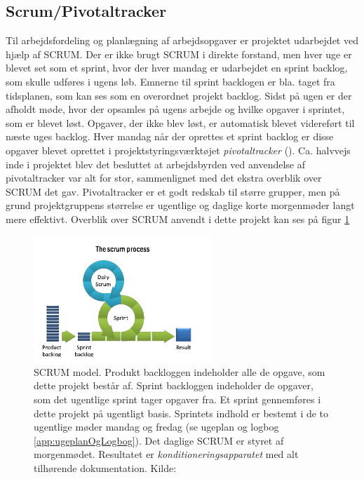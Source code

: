 \subsection{Scrum/Pivotaltracker} \label{title:scrum}
Til arbejdsfordeling og planlægning af arbejdsopgaver er projektet udarbejdet ved hjælp af SCRUM. Der er ikke brugt SCRUM i direkte forstand, men hver uge er blevet set som et sprint, hvor der hver mandag er udarbejdet en sprint backlog, som skulle udføres i ugens løb. Emnerne til sprint backlogen er bla. taget fra tidsplanen, som kan ses som en overordnet projekt backlog. Sidst på ugen er der afholdt møde, hvor der opsamles på ugens arbejde og hvilke opgaver i sprintet, som er blevet løst. Opgaver, der ikke blev løst, er automatisk blevet videreført til næste uges backlog. Hver mandag når der oprettes et sprint backlog er disse opgaver blevet oprettet i projektstyringsværktøjet \textit{pivotaltracker} (\cite{RefWorks:36}). Ca. halvvejs inde i projektet blev det besluttet at arbejdsbyrden ved anvendelse af pivotaltracker var alt for stor, sammenlignet med det ekstra overblik over SCRUM det gav. Pivotaltracker er et godt redskab til større grupper, men på grund projektgruppens størrelse er ugentlige og daglige korte morgenmøder langt mere effektivt. Overblik over SCRUM anvendt i dette projekt kan ses på figur \ref{fig:scrumProcess}

	\begin{figure}[H]
		\centering
		\includegraphics[width = 0.6\textwidth]{billeder/scrumProcess.png}
		\caption{SCRUM model. Produkt backloggen indeholder alle de opgave, som dette projekt består af. Sprint backloggen indeholder de opgaver, som det ugentlige sprint tager opgaver fra. Et sprint gennemføres i dette projekt på ugentligt basis. Sprintets indhold er bestemt i de to ugentlige møder mandag og fredag (se ugeplan og logbog \ref{app:ugeplanOgLogbog}). Det daglige SCRUM er styret af morgenmødet. Resultatet er \textit{konditioneringsapparatet} med alt tilhørende dokumentation. Kilde: \cite{Billede:1}}\label{fig:scrumProcess}
	\end{figure}

